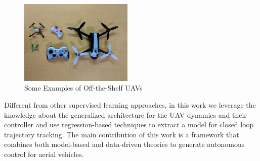 \documentclass[letterpaper, 10 pt, conference]{ieeeconf}  %
\newcommand\NB[1]{$\spadesuit$\footnote{NB: #1}}
\begin{document}
\begin{figure}[ht]
    \includegraphics[width=0.48\textwidth]{images/uavs.jpg}
    \caption{Some Examples of Off-the-Shelf UAVs}
    \label{fig:uavs}
\end{figure}

Different from other supervised learning approaches, in this work we leverage the knowledge about the generalized architecture for the UAV dynamics and their controller and use regression-based techniques to extract a model for closed loop trajectory tracking. The main contribution of this work is a framework that combines both model-based and data-driven theories to generate autonomous control for aerial vehicles. 
 
 



\end{document}
